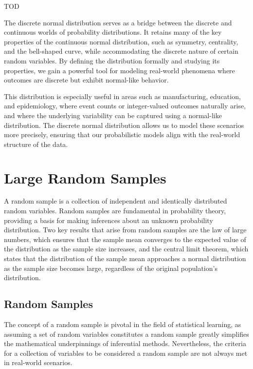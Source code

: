 \begin{example}
TOD
\end{example}

The discrete normal distribution serves as a bridge between the discrete and continuous worlds of probability distributions. It retains many of the key properties of the continuous normal distribution, such as symmetry, centrality, and the bell-shaped curve, while accommodating the discrete nature of certain random variables. By defining the distribution formally and studying its properties, we gain a powerful tool for modeling real-world phenomena where outcomes are discrete but exhibit normal-like behavior.

This distribution is especially useful in areas such as manufacturing, education, and epidemiology, where event counts or integer-valued outcomes naturally arise, and where the underlying variability can be captured using a normal-like distribution. The discrete normal distribution allows us to model these scenarios more precisely, ensuring that our probabilistic models align with the real-world structure of the data.


%
%

\section{Large Random Samples}
\label{sec:probability_random_samples}

A random sample is a collection of independent and identically distributed random variables. Random samples are fundamental in probability theory, providing a basis for making inferences about an unknown probability distribution. Two key results that arise from random samples are the law of large numbers, which ensures that the sample mean converges to the expected value of the distribution as the sample size increases, and the central limit theorem, which states that the distribution of the sample mean approaches a normal distribution as the sample size becomes large, regardless of the original population's distribution.


\subsection{Random Samples}

The concept of a random sample is pivotal in the field of statistical learning, as assuming a set of random variables constitutes a random sample greatly simplifies the mathematical underpinnings of inferential methods. Nevertheless, the criteria for a collection of variables to be considered a random sample are not always met in real-world scenarios.

